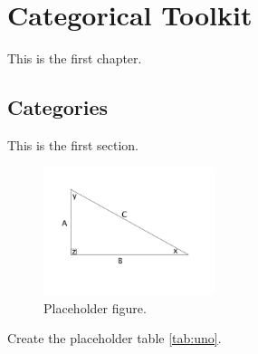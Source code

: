 \documentclass[12pt,a4paper,openright,twoside]{report}
\begin{document}

\tableofcontents
\rhead[\fancyplain{}{\bfseries\leftmark}]{\fancyplain{}{\bfseries\thepage}} 

\listoffigures                         


\listoftables                           







\chapter{Categorical Toolkit}
\lhead[\fancyplain{}{\bfseries\thepage}]{\fancyplain{}{\bfseries\rightmark}}







  This is the first chapter.



  \section{Categories}                 
  This is the first section.

  \begin{figure}[h]
    \begin{center}                         
      \includegraphics[width=5cm]{figures/triangle.jpg}
      \caption[Placeholder]{Placeholder figure.}\label{fig:first}
    \end{center}
  \end{figure}

  Create the placeholder table \ref{tab:uno}.
\end{document}
